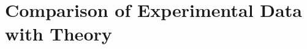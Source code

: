 \documentclass[../main.tex]{subfiles}
\begin{document}
\chapter{Comparison of Experimental Data with Theory}
\end{document}
